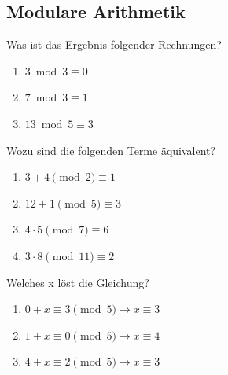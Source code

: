 \documentclass[11pt, a4paper]{article}
\begin{document}
\subsection{Modulare Arithmetik}
Was ist das Ergebnis folgender Rechnungen?
\begin{enumerate}
	\item $3 \bmod 3 \equiv 0$
	\item $7 \bmod 3 \equiv 1$
	\item $13 \bmod 5 \equiv 3$
\end{enumerate}
Wozu sind die folgenden Terme äquivalent?
\begin{enumerate}
	\item $3 + 4 \pmod 2 \equiv 1$
	\item $12 + 1 \pmod 5 \equiv 3$
	\item $4 \cdot 5 \pmod 7 \equiv 6$
	\item $3 \cdot 8 \pmod {11} \equiv 2$
\end{enumerate}
Welches x löst die Gleichung?
\begin{enumerate}
	\item $0 + x \equiv 3 \pmod 5 \rightarrow x \equiv 3$
	\item $1 + x \equiv 0 \pmod 5 \rightarrow x \equiv 4$
	\item $4 + x \equiv 2 \pmod 5 \rightarrow x \equiv 3$
\end{enumerate}
\end{document}
